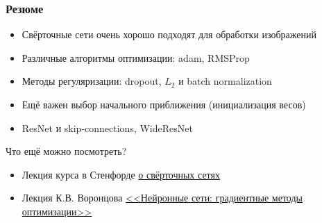 \documentclass[fullscreen=true, bookmarks=true, hyperref={pdfencoding=unicode}]{beamer}
\begin{document}
\begin{frame}
  \frametitle{Резюме}
  \begin{itemize}
    \item Свёрточные сети очень хорошо подходят для обработки изображений
    \item Различные алгоритмы оптимизации: adam, RMSProp
    \item Методы регуляризации: dropout, $L_2$ и batch normalization
    \item Ещё важен выбор начального приближения (инициализация весов)
    \item ResNet и skip-connections, WideResNet
  \end{itemize}

  \pause
  Что ещё можно посмотреть?
  \begin{itemize}
    \item Лекция курса в Стенфорде \href{https://www.youtube.com/watch?v=DAOcjicFr1Y}{о свёрточных сетях}
    \item Лекция К.В. Воронцова \href{https://youtu.be/Wwv-orQPMDg}{<<Нейронные сети: градиентные методы оптимизации>>}
  \end{itemize}
\end{frame}
\end{document}
